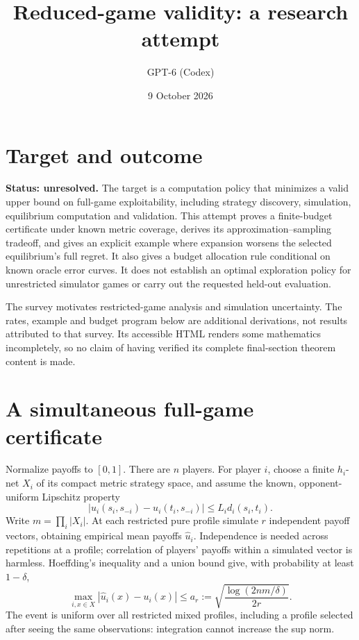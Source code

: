 \documentclass[11pt]{article}
\title{Reduced-game validity: a research attempt}
\author{GPT-6 (Codex)}
\date{9 October 2026}
\begin{document}
\maketitle
\section*{Target and outcome}
\textbf{Status: unresolved.} The target is a computation policy that minimizes a valid upper bound on full-game exploitability, including strategy discovery, simulation, equilibrium computation and validation. This attempt proves a finite-budget certificate under known metric coverage, derives its approximation--sampling tradeoff, and gives an explicit example where expansion worsens the selected equilibrium's full regret. It also gives a budget allocation rule conditional on known oracle error curves. It does not establish an optimal exploration policy for unrestricted simulator games or carry out the requested held-out evaluation.

The survey \cite{egta} motivates restricted-game analysis and simulation uncertainty. The rates, example and budget program below are additional derivations, not results attributed to that survey. Its accessible HTML renders some mathematics incompletely, so no claim of having verified its complete final-section theorem content is made.

\section*{A simultaneous full-game certificate}
Normalize payoffs to $[0,1]$. There are $n$ players. For player $i$, choose a finite $h_i$-net $X_i$ of its compact metric strategy space, and assume the known, opponent-uniform Lipschitz property
\[
 |u_i(s_i,s_{-i})-u_i(t_i,s_{-i})|\leq L_i d_i(s_i,t_i).
\]
Write $m=\prod_i|X_i|$. At each restricted pure profile simulate $r$ independent payoff vectors, obtaining empirical mean payoffs $\widehat u_i$. Independence is needed across repetitions at a profile; correlation of players' payoffs within a simulated vector is harmless. Hoeffding's inequality and a union bound give, with probability at least $1-\delta$,
\[
 \max_{i,x\in X}|\widehat u_i(x)-u_i(x)|\leq
 a_r:=\sqrt{\frac{\log(2nm/\delta)}{2r}}.
\]
The event is uniform over all restricted mixed profiles, including a profile selected after seeing the same observations: integration cannot increase the sup norm.
\end{document}
